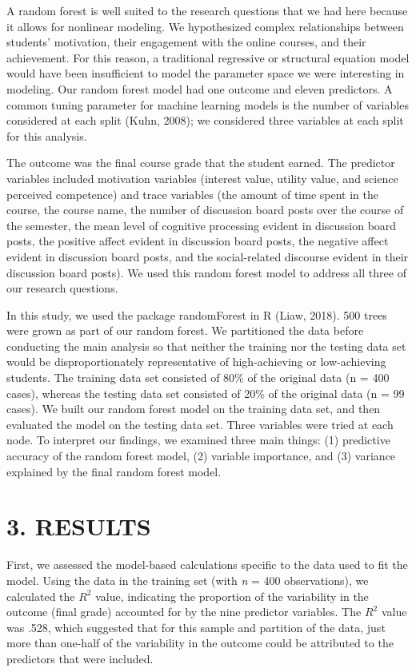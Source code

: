 \documentclass[,acmart]{apa6}
\begin{document}
A random forest is well suited to the research questions that we had
here because it allows for nonlinear modeling. We hypothesized complex
relationships between students' motivation, their engagement with the
online courses, and their achievement. For this reason, a traditional
regressive or structural equation model would have been insufficient to
model the parameter space we were interesting in modeling. Our random
forest model had one outcome and eleven predictors. A common tuning
parameter for machine learning models is the number of variables
considered at each split (Kuhn, 2008); we considered three variables at
each split for this analysis.

The outcome was the final course grade that the student earned. The
predictor variables included motivation variables (interest value,
utility value, and science perceived competence) and trace variables
(the amount of time spent in the course, the course name, the number of
discussion board posts over the course of the semester, the mean level
of cognitive processing evident in discussion board posts, the positive
affect evident in discussion board posts, the negative affect evident in
discussion board posts, and the social-related discourse evident in
their discussion board posts). We used this random forest model to
address all three of our research questions.

In this study, we used the package randomForest in R (Liaw, 2018). 500
trees were grown as part of our random forest. We partitioned the data
before conducting the main analysis so that neither the training nor the
testing data set would be disproportionately representative of
high-achieving or low-achieving students. The training data set
consisted of 80\% of the original data (n = 400 cases), whereas the
testing data set consisted of 20\% of the original data (n = 99 cases).
We built our random forest model on the training data set, and then
evaluated the model on the testing data set. Three variables were tried
at each node. To interpret our findings, we examined three main things:
(1) predictive accuracy of the random forest model, (2) variable
importance, and (3) variance explained by the final random forest model.

\section{3. RESULTS}\label{results}

First, we assessed the model-based calculations specific to the data
used to fit the model. Using the data in the training set (with \emph{n}
= 400 observations), we calculated the \(R^2\) value, indicating the
proportion of the variability in the outcome (final grade) accounted for
by the nine predictor variables. The \(R^2\) value was .528, which
suggested that for this sample and partition of the data, just more than
one-half of the variability in the outcome could be attributed to the
predictors that were included.
\end{document}
